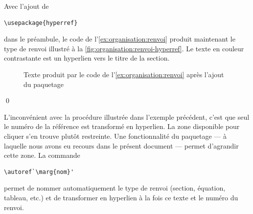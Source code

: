 \begin{exemple}
  \label{ex:organisation:renvoi-hyperref}
  Avec l'ajout de
\begin{lstlisting}
\usepackage{hyperref}
\end{lstlisting}
  dans le préambule, le code de l'\autoref{ex:organisation:renvoi}
  produit maintenant le type de renvoi illustré à la
  \autoref{fig:organisation:renvoi-hyperref}. Le texte en couleur
  contrastante est un hyperlien vers le titre de la section.

  \begin{figure}
    \centering
    \caption{Texte produit par le code de
      l'\autoref{ex:organisation:renvoi} après l'ajout du paquetage
      }
    \label{fig:organisation:renvoi-hyperref}
  \end{figure}
  \qed
\end{exemple}

L'inconvénient avec la procédure illustrée dans l'exemple précédent,
c'est que seul le numéro de la référence est transformé en hyperlien.
La zone disponible pour cliquer s'en trouve plutôt restreinte. Une
fonctionnalité du paquetage  --- à laquelle nous avons eu
recours dans le présent document --- permet d'agrandir cette zone. La
commande
\begin{lstlisting}
\autoref`\marg{nom}'
\end{lstlisting}
permet de nommer automatiquement le type de renvoi (section, équation,
tableau, etc.) et de transformer en hyperlien à la fois ce texte et le
numéro du renvoi.

